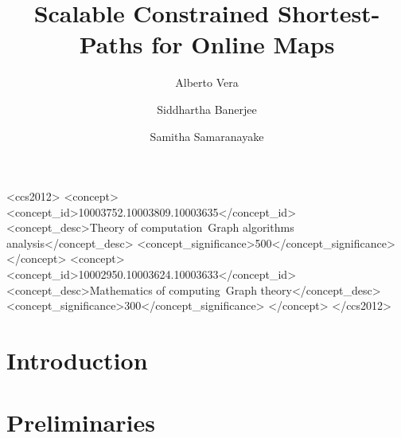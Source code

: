\documentclass[screen,sigconf,anonymous,review]{acmart}
\begin{document}
\title{Scalable Constrained Shortest-Paths for Online Maps}
\author{Alberto Vera}
\author{Siddhartha Banerjee}
\author{Samitha Samaranayake}

\begin{abstract}

\end{abstract}



%
%
\begin{CCSXML}
<ccs2012>
<concept>
<concept_id>10003752.10003809.10003635</concept_id>
<concept_desc>Theory of computation~Graph algorithms analysis</concept_desc>
<concept_significance>500</concept_significance>
</concept>
<concept>
<concept_id>10002950.10003624.10003633</concept_id>
<concept_desc>Mathematics of computing~Graph theory</concept_desc>
<concept_significance>300</concept_significance>
</concept>
	</ccs2012>  
\end{CCSXML}




\maketitle

\section{Introduction}


\section{Preliminaries}
\label{sec:prelim}



%
\end{document}
